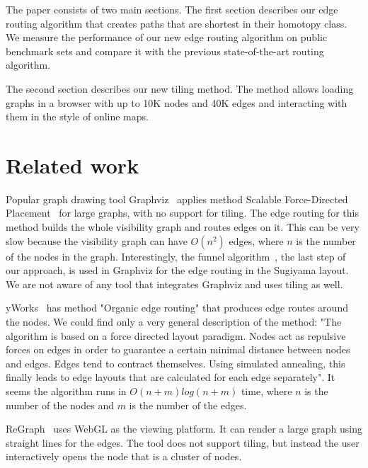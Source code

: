 \documentclass{llncs}
\begin{document}
The paper consists of two main sections. 
The first section describes our edge routing algorithm that creates paths that are shortest in their homotopy class. 
We measure the performance of our new edge routing algorithm on public benchmark sets and compare 
it with the previous state-of-the-art routing algorithm. 

The second section describes our new tiling method. The method allows loading graphs in a browser 
with up to 10K nodes and 40K edges and interacting with them in the style of online maps.



\section{Related work}\label{relwork}
Popular graph drawing tool Graphviz~\cite{graphviz} applies method
Scalable Force-Directed Placement~\cite{sfdp} for large graphs, with no
support for tiling. The edge routing for this method builds the whole
visibility graph and routes edges on it. This can be very slow because the visibility graph can have $O(n^2)$ edges, where $n$ is the number of the nodes in the graph.
Interestingly, the funnel algorithm~\cite{chazelle1982theorem,hershberger1994computing},
the last step of our approach, is used in Graphviz for the edge routing in the
Sugiyama layout. We are not aware of any tool that integrates Graphviz
and uses tiling as well.

yWorks~\cite{yworks} has method "Organic edge routing" that produces edge
routes around the nodes. We could find only
a very general description of the method: "The algorithm is based on a force
directed layout paradigm. Nodes act as repulsive forces on edges in order to
guarantee a certain minimal distance between nodes and edges. Edges tend to contract
themselves. Using simulated annealing, this finally leads to edge layouts that
are calculated for each edge separately". It seems the algorithm runs in $O(n+m)log(n+m)$
time, where $n$ is the number of the nodes and $m$ is the number of the edges.

ReGraph~\cite{regraph} uses WebGL as the viewing platform. It can render a large
graph using straight lines for the edges. The tool does not support tiling, but instead
the user interactively opens the node that is a cluster of nodes.
\end{document}

